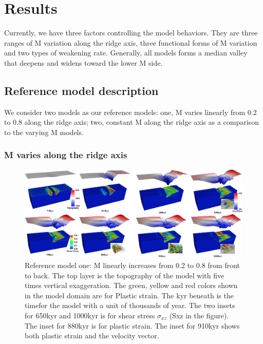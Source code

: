 \pagebreak
\section{Results}

Currently, we have three factors controlling the model behaviors. They are three ranges of M variation along the ridge axis, three functional forms of M variation and two types of weakening rate. Generally, all models forms a median valley that deepens and widens toward the lower M side. 

\subsection{Reference model description}
We consider two models as our reference models: one, M varies linearly from 0.2 to 0.8 along the ridge axis; two, constant M along the ridge axis as a comparison to the varying M models.

\subsubsection{M varies along the ridge axis}

\begin{figure}[H]
  \centering
    \includegraphics[width=1.0\textwidth]{fig_Results1_1.png}
  \caption{Reference model one: M linearly increases from 0.2 to 0.8 from front to back. The top layer is the topography of the model with five times vertical exaggeration. The green, yellow and red colors shown in the model domain are for Plastic strain. The kyr beneath is the timefor the model with a unit of thousands of year. The two insets for 650kyr and 1000kyr is for shear stress $\sigma_{xz}$ (Sxz in the figure). The inset for 880kyr is for plastic strain. The inset for 910kyr shows both plastic strain and the velocity vector.} %
 \label{fig_Results1_1}
\end{figure}   

